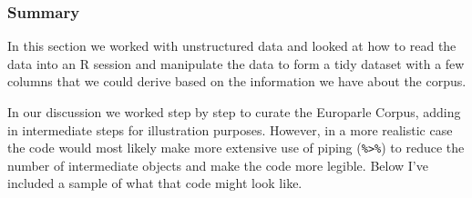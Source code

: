 \documentclass[
]{article}
\begin{document}
\hypertarget{summary-5}{%
\subsubsection{Summary}\label{summary-5}}

In this section we worked with unstructured data and looked at how to read the data into an R session and manipulate the data to form a tidy dataset with a few columns that we could derive based on the information we have about the corpus.

In our discussion we worked step by step to curate the Europarle Corpus, adding in intermediate steps for illustration purposes. However, in a more realistic case the code would most likely make more extensive use of piping (\texttt{\%\textgreater{}\%}) to reduce the number of intermediate objects and make the code more legible. Below I've included a sample of what that code might look like.
\end{document}
